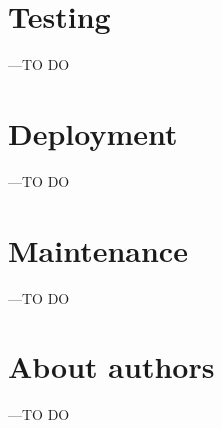 \documentclass[a4paper]{article}
\begin{document}
\section{Testing}
---TO DO
\section{Deployment}
---TO DO

\section{Maintenance}
---TO DO

\section{About authors}
---TO DO


\end{document}
